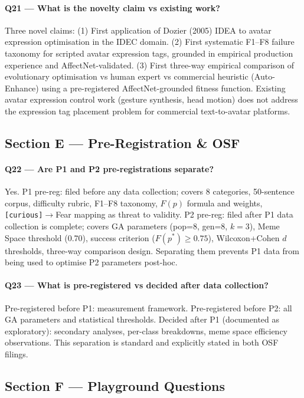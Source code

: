 \documentclass[12pt,a4paper]{article}
\begin{document}
\paragraph{Q21 --- What is the novelty claim vs existing work?}
Three novel claims: (1) First application of Dozier (2005) IDEA to avatar expression optimisation in the IDEC domain. (2) First systematic F1--F8 failure taxonomy for scripted avatar expression tags, grounded in empirical production experience and AffectNet-validated. (3) First three-way empirical comparison of evolutionary optimisation vs human expert vs commercial heuristic (Auto-Enhance) using a pre-registered AffectNet-grounded fitness function. Existing avatar expression control work (gesture synthesis, head motion) does not address the expression tag placement problem for commercial text-to-avatar platforms.

\subsection*{Section E --- Pre-Registration \& OSF}

\paragraph{Q22 --- Are P1 and P2 pre-registrations separate?}
Yes. P1 pre-reg: filed before any data collection; covers 8 categories, 50-sentence corpus, difficulty rubric, F1--F8 taxonomy, $F(p)$ formula and weights, \texttt{[curious]}$\to$Fear mapping as threat to validity. P2 pre-reg: filed after P1 data collection is complete; covers GA parameters (pop=8, gen=8, $k=3$), Meme Space threshold (0.70), success criterion ($F(p^*)\geq 0.75$), Wilcoxon+Cohen $d$ thresholds, three-way comparison design. Separating them prevents P1 data from being used to optimise P2 parameters post-hoc.

\paragraph{Q23 --- What is pre-registered vs decided after data collection?}
Pre-registered before P1: measurement framework. Pre-registered before P2: all GA parameters and statistical thresholds. Decided after P1 (documented as exploratory): secondary analyses, per-class breakdowns, meme space efficiency observations. This separation is standard and explicitly stated in both OSF filings.

\subsection*{Section F --- Playground Questions}
\end{document}
